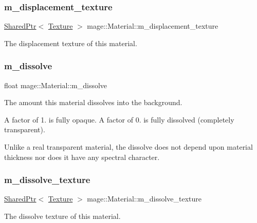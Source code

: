 \subsubsection{\texorpdfstring{m\+\_\+displacement\+\_\+texture}{m\_displacement\_texture}}
{\footnotesize\ttfamily \hyperlink{namespacemage_a1e01ae66713838a7a67d30e44c67703e}{Shared\+Ptr}$<$ \hyperlink{classmage_1_1_texture}{Texture} $>$ mage\+::\+Material\+::m\+\_\+displacement\+\_\+texture}

The displacement texture of this material. \hypertarget{structmage_1_1_material_a42b435ea58ce7da4b48febe9bb33aba7}{}\label{structmage_1_1_material_a42b435ea58ce7da4b48febe9bb33aba7} 
\subsubsection{\texorpdfstring{m\+\_\+dissolve}{m\_dissolve}}
{\footnotesize\ttfamily float mage\+::\+Material\+::m\+\_\+dissolve}

The amount this material dissolves into the background.

A factor of 1. is fully opaque. A factor of 0. is fully dissolved (completely transparent).

Unlike a real transparent material, the dissolve does not depend upon material thickness nor does it have any spectral character. \hypertarget{structmage_1_1_material_aa68e02ed3da6000effc3aadcc99fa4b5}{}\label{structmage_1_1_material_aa68e02ed3da6000effc3aadcc99fa4b5} 
\subsubsection{\texorpdfstring{m\+\_\+dissolve\+\_\+texture}{m\_dissolve\_texture}}
{\footnotesize\ttfamily \hyperlink{namespacemage_a1e01ae66713838a7a67d30e44c67703e}{Shared\+Ptr}$<$ \hyperlink{classmage_1_1_texture}{Texture} $>$ mage\+::\+Material\+::m\+\_\+dissolve\+\_\+texture}

The dissolve texture of this material. \hypertarget{structmage_1_1_material_a8b584541ab8bfc527f856c68bb0152e7}{}\label{structmage_1_1_material_a8b584541ab8bfc527f856c68bb0152e7} 
